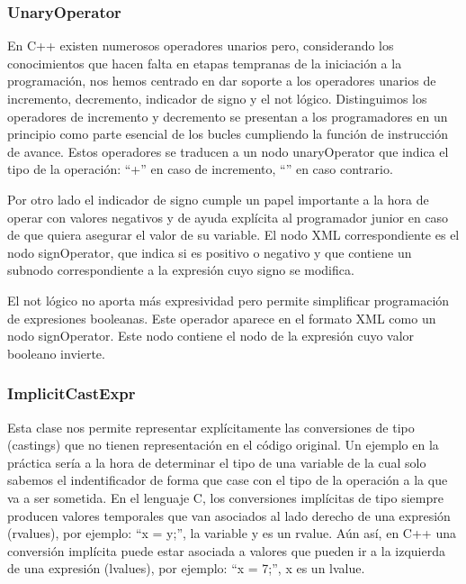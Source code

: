 \subsubsection*{UnaryOperator}

En C++ existen numerosos operadores unarios pero, considerando los conocimientos que hacen falta en etapas tempranas de la iniciaci\'on a la programaci\'on, nos hemos centrado en dar soporte a los operadores unarios de incremento, decremento, indicador de signo y el not l\'ogico. Distinguimos los operadores de incremento y decremento se presentan a los programadores en un principio como parte esencial de los bucles cumpliendo la funci\'on de instrucci\'on de avance. Estos operadores se traducen a un nodo unaryOperator que indica el tipo de la operaci\'on: ``+'' en caso de incremento, ``'' en caso contrario.



Por otro lado el indicador de signo cumple un papel importante a la hora de operar con valores negativos y de ayuda expl\'icita al programador junior en caso de que quiera asegurar el valor de su variable. El nodo XML correspondiente es el nodo signOperator, que indica si es positivo o negativo y que contiene un subnodo correspondiente a la expresi\'on cuyo signo se modifica.



El not l\'ogico no aporta m\'as expresividad pero permite simplificar programaci\'on de expresiones booleanas. Este operador aparece en el formato XML como un nodo signOperator. Este nodo contiene el nodo de la expresi\'on cuyo valor booleano invierte.

\subsubsection*{ImplicitCastExpr}

Esta clase nos permite representar expl\'icitamente las conversiones de tipo (castings) que no tienen representaci\'on en el c\'odigo original. Un ejemplo en la pr\'actica ser\'ia a la hora de determinar el tipo de una variable de la cual solo sabemos el indentificador de forma que case con el tipo de la operaci\'on a la que va a ser sometida. En el lenguaje C, los conversiones impl\'icitas de tipo siempre producen valores temporales que van asociados al lado derecho de una expresi\'on (rvalues), por ejemplo: ``x = y;'', la variable y es un rvalue. A\'un as\'i, en C++ una conversi\'on impl\'icita puede estar asociada a valores que pueden ir a la izquierda de una expresi\'on (lvalues), por ejemplo: ``x = 7;'', x es un lvalue.

